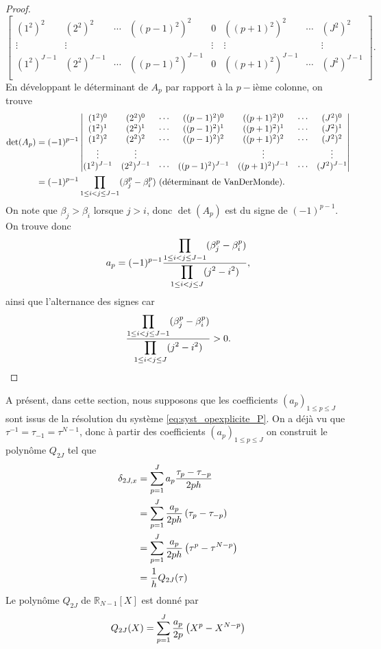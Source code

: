 \begin{proof}
\begin{equation}
\begin{bmatrix}
(1^2)^2 & (2^2)^2 & \cdots & ((p-1)^2)^2 & 0 & ((p+1)^2)^2 & \cdots & (J^2)^2 \\
\vdots & \vdots &  &  & \vdots & \vdots &  & \vdots \\
(1^2)^{J-1} & (2^2)^{J-1} & \cdots & ((p-1)^2)^{J-1} & 0 & ((p+1)^2)^{J-1} & \cdots & (J^2)^{J-1} \\
\end{bmatrix} .
\end{equation}
En développant le déterminant de $A_p$ par rapport à la $p-$ième colonne, on trouve
\begin{align*}
\det (A_p) & = (-1)^{p-1}  \begin{vmatrix}
(1^2)^0 & (2^2)^0 & \cdots & ((p-1)^2)^0 & ((p+1)^2)^0 & \cdots & (J^2)^0 \\ 
(1^2)^1 & (2^2)^1 & \cdots & ((p-1)^2)^1 & ((p+1)^2)^1 & \cdots & (J^2)^1 \\
(1^2)^2 & (2^2)^2 & \cdots & ((p-1)^2)^2 & ((p+1)^2)^2 & \cdots & (J^2)^2 \\
\vdots & \vdots &  &  & \vdots & & \vdots \\
(1^2)^{J-1} & (2^2)^{J-1} & \cdots & ((p-1)^2)^{J-1} & ((p+1)^2)^{J-1} & \cdots & (J^2)^{J-1} \\
\end{vmatrix} \\
	& = (-1)^{p-1} \displaystyle\prod\limits_{1 \leq i <j \leq J-1}(\beta_j^p - \beta_i^p) \text{ (déterminant de VanDerMonde).}
\end{align*}
On note que $\beta_j > \beta_i$ lorsque $j>i$, donc $\det (A_p)$ est du signe de $(-1)^{p-1}$.
On trouve donc 
\begin{equation}
a_p = (-1)^{p-1} \dfrac{\displaystyle\prod\limits_{1 \leq i <j \leq J-1}(\beta_j^p - \beta_i^p)}{\displaystyle\prod\limits_{1 \leq i <j \leq J}(j^2 - i^2)},
\end{equation}
ainsi que l'alternance des signes car
\begin{equation}
\dfrac{\displaystyle\prod\limits_{1 \leq i <j \leq J-1}(\beta_j^p - \beta_i^p)}{\displaystyle\prod\limits_{1 \leq i <j \leq J}(j^2 - i^2)} > 0.
\end{equation}
\end{proof}
A présent, dans cette section, nous supposons que les coefficients $(a_p)_{1 \leq p \leq J}$ sont issus de la résolution du système \eqref{eq:syst_opexplicite_P}. On a déjà vu que $\tau^{-1} = \tau_{-1} = \tau^{N-1}$, donc à partir des coefficients $(a_p)_{1 \leq p \leq J}$ on construit le polynôme $Q_{2J}$ tel que
\begin{align*}
\delta_{2J,x} & = \displaystyle\sum\limits_{p=1}^J a_p \dfrac{\tau_p - \tau_{-p}}{2ph}\\
	& = \displaystyle\sum\limits_{p=1}^J \dfrac{a_p}{2ph} \left( \tau_p - \tau_{-p} \right)\\
	& = \displaystyle\sum\limits_{p=1}^J \dfrac{a_p}{2ph} \left( \tau^p - \tau^{N-p} \right)\\
	& = \dfrac{1}{h} Q_{2J}(\tau)
\end{align*}
Le polynôme $Q_{2J}$ de $\mathbb{R}_{N-1}[X]$ est donné par
\begin{equation}
Q_{2J}(X) = \displaystyle\sum\limits_{p=1}^J \dfrac{a_p}{2p} \left( X^p - X^{N-p} \right)
\end{equation}

